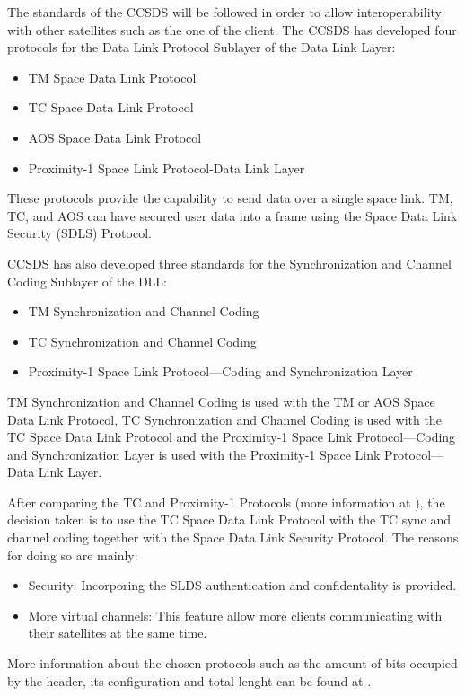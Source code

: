 The standards of the CCSDS will be followed in order to allow interoperability with other satellites such as the one of the client. The CCSDS has developed four protocols for the Data Link Protocol Sublayer of the Data Link Layer\cite{Secretariat2014}:

\begin{itemize}
\item TM Space Data Link Protocol
\item TC Space Data Link Protocol
\item AOS Space Data Link Protocol
\item Proximity-1 Space Link Protocol-Data Link Layer
\end{itemize}

These protocols provide the capability to send data over a single space link. TM, TC, and AOS can have secured user data into a frame using the Space Data Link Security (SDLS) Protocol.

CCSDS has also developed three standards for the Synchronization and Channel Coding Sublayer of the DLL:
\begin{itemize}
\item TM Synchronization and Channel Coding
\item TC Synchronization and Channel Coding
\item Proximity-1 Space Link Protocol—Coding and Synchronization Layer
\end{itemize}

TM Synchronization and Channel Coding is used with the TM or AOS Space Data Link Protocol, TC Synchronization and Channel Coding is used with the TC Space Data Link Protocol and the Proximity-1 Space Link Protocol—Coding and Synchronization Layer is used with the Proximity-1 Space Link Protocol—Data Link Layer. 

After comparing the TC and Proximity-1 Protocols (more information at \cite[Chapter 1, Section 1]{annex3}), the decision taken is to use the TC Space Data Link Protocol with the TC sync and channel coding together with the Space Data Link Security Protocol. The reasons for doing so are mainly:

\begin{itemize}
\item Security: Incorporing the SLDS authentication and confidentality is provided.
\item More virtual channels: This feature allow more clients communicating with their satellites at the same time.
\end{itemize}

More information about the chosen protocols such as the amount of bits occupied by the header, its configuration and total lenght can be found at \cite[Chapter 1, Section 1]{annex3}.